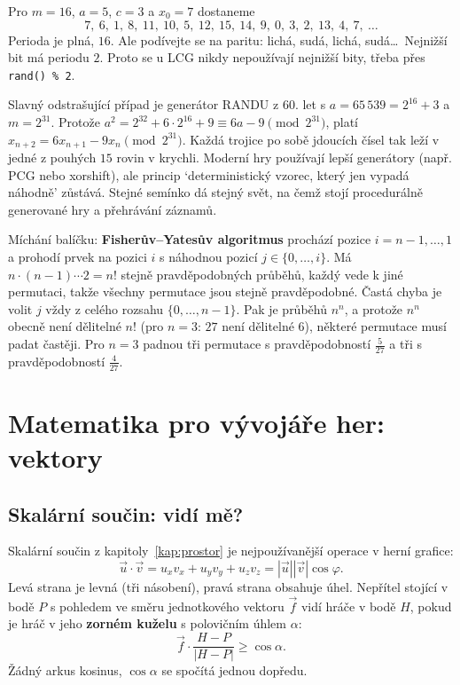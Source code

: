 \begin{example}
  Pro $m = 16$, $a = 5$, $c = 3$ a $x_0 = 7$ dostaneme
  \begin{equation*}
    7,\ 6,\ 1,\ 8,\ 11,\ 10,\ 5,\ 12,\ 15,\ 14,\ 9,\ 0,\ 3,\ 2,\ 13,\ 4,\ 7,\ \dots
  \end{equation*}
  Perioda je plná, $16$. Ale podívejte se na paritu: lichá, sudá, lichá, sudá\dots\ Nejnižší bit má periodu $2$. Proto se u LCG nikdy nepoužívají nejnižší bity, třeba přes \texttt{rand() \% 2}.
\end{example}

Slavný odstrašující případ je generátor RANDU z 60. let s $a = 65\,539 = 2^{16} + 3$ a $m = 2^{31}$. Protože $a^2 = 2^{32} + 6\cdot 2^{16} + 9\equiv 6a - 9\pmod{2^{31}}$, platí $x_{n+2} = 6x_{n+1} - 9x_n\pmod{2^{31}}$. Každá trojice po sobě jdoucích čísel tak leží v jedné z pouhých $15$ rovin v krychli. Moderní hry používají lepší generátory (např. PCG nebo xorshift), ale princip `deterministický vzorec, který jen vypadá náhodně' zůstává. Stejné semínko dá stejný svět, na čemž stojí procedurálně generované hry a přehrávání záznamů.

\begin{note}
  Míchání balíčku: \textbf{Fisherův--Yatesův algoritmus} prochází pozice $i = n - 1, \dots, 1$ a prohodí prvek na pozici $i$ s náhodnou pozicí $j\in\{0, \dots, i\}$. Má $n\cdot(n - 1)\cdots 2 = n!$ stejně pravděpodobných průběhů, každý vede k jiné permutaci, takže všechny permutace jsou stejně pravděpodobné. Častá chyba je volit $j$ vždy z celého rozsahu $\{0, \dots, n - 1\}$. Pak je průběhů $n^n$, a protože $n^n$ obecně není dělitelné $n!$ (pro $n = 3$: $27$ není dělitelné $6$), některé permutace musí padat častěji. Pro $n = 3$ padnou tři permutace s pravděpodobností $\frac{5}{27}$ a tři s pravděpodobností $\frac{4}{27}$.
\end{note}

\section{Matematika pro vývojáře her: vektory}

\subsection{Skalární součin: vidí mě?}

Skalární součin z kapitoly~\ref{kap:prostor} je nejpoužívanější operace v herní grafice:
\begin{equation*}
  \vec{u}\cdot\vec{v} = u_xv_x + u_yv_y + u_zv_z = |\vec{u}||\vec{v}|\cos\varphi.
\end{equation*}
Levá strana je levná (tři násobení), pravá strana obsahuje úhel. Nepřítel stojící v bodě $P$ s pohledem ve směru jednotkového vektoru $\vec{f}$ vidí hráče v bodě $H$, pokud je hráč v jeho \textbf{zorném kuželu} s polovičním úhlem $\alpha$:
\begin{equation*}
  \vec{f}\cdot\frac{H - P}{|H - P|}\geq\cos\alpha.
\end{equation*}
Žádný arkus kosinus, $\cos\alpha$ se spočítá jednou dopředu.

